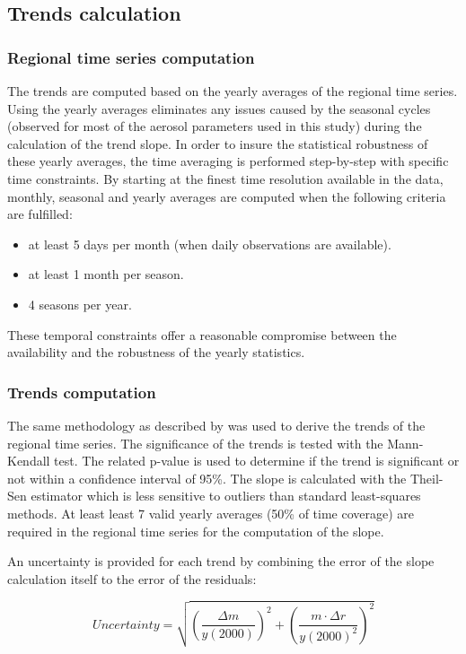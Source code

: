 \documentclass[journal abbreviation, manuscript]{copernicus}
\begin{document}
\subsection{Trends calculation}

\subsubsection{Regional time series computation}
The trends are computed based on the yearly averages of the regional time series. Using the yearly averages eliminates any issues caused by the seasonal cycles (observed for most of the aerosol parameters used in this study) during the calculation of the trend slope. In order to insure the statistical robustness of these yearly averages, the time averaging is performed step-by-step with specific time constraints. By starting at the finest time resolution available in the data, monthly, seasonal and yearly averages are computed when the following criteria are fulfilled:
\begin{itemize}
 \item at least 5 days per month (when daily observations are available).
 \item at least 1 month per season.
 \item 4 seasons per year.
\end{itemize}
These temporal constraints offer a reasonable compromise between the availability and the robustness of the yearly statistics.

\subsubsection{Trends computation}
The same methodology as described by \cite{aas2019global} was used to derive the trends of the regional time series. The significance of the trends is tested with the Mann-Kendall test. The related p-value is used to determine if the trend is significant or not within a confidence interval of 95\%. The slope is calculated with the Theil-Sen estimator which is less sensitive to outliers than standard least-squares methods. At least least 7 valid yearly averages (50\% of time coverage) are required in the regional time series for the computation of the slope.

An uncertainty is provided for each trend by combining the error of the slope calculation itself to the error of the residuals:

\begin{equation}
 Uncertainty = \sqrt{{\left (\frac{\Delta m}{y(2000)}\right )}^{2} + {\left ( \frac{m \cdot \Delta r}{y(2000)^2}\right )}^{2} }
\end{equation}
\end{document}
